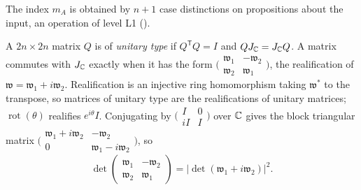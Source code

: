 The index $m_A$ is obtained by $n+1$ case distinctions on propositions about the input, an operation of level L1 ().

A $2n\times2n$ matrix $Q$ is of \emph{unitary type} if $Q^{\mathsf T}Q=I$ and $QJ_{\mathbb{C}}=J_{\mathbb{C}} Q$. A matrix commutes with $J_{\mathbb{C}}$ exactly when it has the form $\bigl(\begin{smallmatrix}\mathfrak w_1&-\mathfrak w_2\\ \mathfrak w_2&\mathfrak w_1\end{smallmatrix}\bigr)$, the realification of $\mathfrak w=\mathfrak w_1+i\mathfrak w_2$. Realification is an injective ring homomorphism taking $\mathfrak w^*$ to the transpose, so matrices of unitary type are the realifications of unitary matrices; $\operatorname{rot}(\theta)$ realifies $e^{i\theta}I$. Conjugating by $\bigl(\begin{smallmatrix}I&0\\iI&I\end{smallmatrix}\bigr)$ over $\mathbb{C}$ gives the block triangular matrix $\bigl(\begin{smallmatrix}\mathfrak w_1+i\mathfrak w_2&-\mathfrak w_2\\0&\mathfrak w_1-i\mathfrak w_2\end{smallmatrix}\bigr)$, so
\begin{equation}\label{eq:iso-realdet}
 \det\begin{pmatrix}\mathfrak w_1&-\mathfrak w_2\\\mathfrak w_2&\mathfrak w_1\end{pmatrix}=\big|\det(\mathfrak w_1+i\mathfrak w_2)\big|^2 .
\end{equation}

